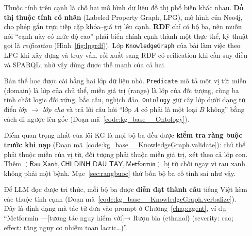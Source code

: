 
Thuộc tính trên cạnh là chỗ hai mô hình dữ liệu đồ thị phổ biến khác nhau. \textbf{Đồ thị thuộc tính có nhãn}
(Labeled Property Graph, LPG), mô hình của Neo4j, cho phép gắn trực tiếp cặp khóa--giá trị lên cạnh.
\textbf{RDF} chỉ có bộ ba, nên muốn nói ``cạnh này có mức độ cao'' phải biến chính cạnh thành một thực thể, kỹ
thuật gọi là \emph{reification} (Hình~\ref{fig:lpgrdf}). Lớp \texttt{KnowledgeGraph} của bài làm việc theo LPG
khi xây dựng và truy vấn, rồi xuất sang RDF có reification khi cần suy diễn và SPARQL; nhờ vậy dùng được thế mạnh
của cả hai.


Bản thể học được cài bằng hai lớp dữ liệu nhỏ. \texttt{Predicate} mô tả một vị từ: miền (domain) là lớp của chủ
thể, miền giá trị (range) là lớp của đối tượng, cùng ba tính chất logic đối xứng, bắc cầu, nghịch đảo.
\texttt{Ontology} giữ cây lớp dưới dạng từ điển \emph{lớp $\to$ lớp cha} và trả lời câu hỏi ``lớp $A$ có phải
là một loại $B$ không'' bằng cách đi ngược lên gốc (Đoạn mã~\ref{code:kg_base__Ontology}).


Điểm quan trọng nhất của lõi KG là mọi bộ ba đều được \textbf{kiểm tra ràng buộc trước khi nạp}
(Đoạn mã~\ref{code:kg_base__KnowledgeGraph.validate}): chủ thể phải thuộc miền của vị từ, đối tượng phải thuộc
miền giá trị, xét theo cả lớp con. Thêm $(\textsf{Rau\_Xanh}, \textsf{CHI\_DINH\_DAU\_TAY}, \textsf{Metformin})$
bị từ chối ngay vì rau xanh không phải một bệnh. Mục~\ref{sec:rangbuoc} thử bốn bộ ba cố tình sai như vậy.


Để LLM đọc được tri thức, mỗi bộ ba được \textbf{diễn đạt thành câu} tiếng Việt kèm các thuộc tính cạnh
(Đoạn mã~\ref{code:kg_base__KnowledgeGraph.verbalize}). Đây là định dạng mà tác tử đưa vào prompt ở
Chương~\ref{chap:agent}, ví dụ ``Metformin —[tương tác nguy hiểm với]→ Rượu bia (ethanol) (severity: cao; effect:
tăng nguy cơ nhiễm toan lactic\dots)''.


